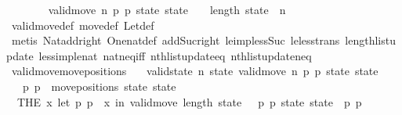 \begin{isabellebody}
\ \ \ \ \ \ \isamarkupfalse%
\ {\isacharbackquoteopen}valid{\isacharunderscore}move{\isacharprime}\ n\ p{}\ p{}\ state\ state{\isacharprime}{\isacharbackquoteclose}\ {\isacharasterisk}\ {\isacharasterisk}{\isacharasterisk}\ \ {\isacartoucheopen}length\ state\ {\isacharequal}\ n\ {\isacharplus}\ {}{\isacartoucheclose}\isanewline
\ \ \ \ \ \ \isamarkupfalse%
\ valid{\isacharunderscore}move{\isacharprime}{\isacharunderscore}def\ move{\isacharunderscore}def\ Let{\isacharunderscore}def\isanewline
\ \ \ \ \ \ \isamarkupfalse%
\ {\isacharparenleft}metis\ Nat{\isachardot}add{\isacharunderscore}{}{\isacharunderscore}right\ One{\isacharunderscore}nat{\isacharunderscore}def\ add{\isacharunderscore}Suc{\isacharunderscore}right\ le{\isacharunderscore}imp{\isacharunderscore}less{\isacharunderscore}Suc\ le{\isacharunderscore}less{\isacharunderscore}trans\ length{\isacharunderscore}list{\isacharunderscore}update\ less{\isacharunderscore}imp{\isacharunderscore}le{\isacharunderscore}nat\ nat{\isacharunderscore}neq{\isacharunderscore}iff\ nth{\isacharunderscore}list{\isacharunderscore}update{\isacharunderscore}eq\ nth{\isacharunderscore}list{\isacharunderscore}update{\isacharunderscore}neq{\isacharparenright}\isanewline
\ \ \isamarkupfalse%
\isanewline
{}\isamarkupfalse%
%
\endisatagproof
{\isafoldproof}%
%
\isadelimproof
\isanewline
%
\endisadelimproof
\isanewline
{}\isamarkupfalse%
\ valid{\isacharunderscore}move{\isacharprime}{\isacharunderscore}move{\isacharunderscore}positions{\isacharcolon}\isanewline
\ \ \ {\isachardoublequoteopen}valid{\isacharunderscore}state\ n\ state{\isachardoublequoteclose}\ {\isachardoublequoteopen}valid{\isacharunderscore}move{\isacharprime}\ n\ p{}\ p{}\ state\ state{\isacharprime}{\isachardoublequoteclose}\isanewline
\ \ \ {\isachardoublequoteopen}{\isacharparenleft}p{}{\isacharcomma}\ p{}{\isacharparenright}\ {\isacharequal}\ move{\isacharunderscore}positions\ state\ state{\isacharprime}{\isachardoublequoteclose}\isanewline
%
\isadelimproof
%
\endisadelimproof
%
\isatagproof
{}\isamarkupfalse%
{\isacharminus}\isanewline
\ \ \isamarkupfalse%
\ {\isacharasterisk}{\isacharcolon}\ {\isachardoublequoteopen}{\isacharparenleft}THE\ x{\isachardot}\ let\ {\isacharparenleft}p{}{\isacharprime}{\isacharcomma}\ p{}{\isacharprime}{\isacharparenright}\ {\isacharequal}\ x\ in\ valid{\isacharunderscore}move{\isacharprime}\ {\isacharparenleft}length\ state\ {\isacharminus}\ {}{\isacharparenright}\ p{}{\isacharprime}\ p{}{\isacharprime}\ state\ state{\isacharprime}{\isacharparenright}\ {\isacharequal}\ {\isacharparenleft}p{}{\isacharcomma}\ p{}{\isacharparenright}{\isachardoublequoteclose}\isanewline

\end{isabellebody}
